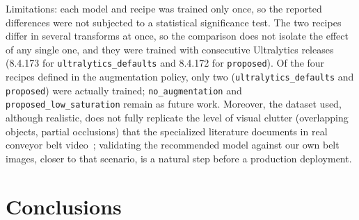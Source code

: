 \documentclass[conference]{IEEEtran}
\begin{document}
Limitations: each model and recipe was trained only once, so the reported differences were
not subjected to a statistical significance test. The two recipes differ in several transforms
at once, so the comparison does not isolate the effect of any single one, and they were
trained with consecutive Ultralytics releases (8.4.173 for \texttt{ultralytics\_defaults} and
8.4.172 for \texttt{proposed}). Of the four recipes defined in the augmentation policy, only two
(\texttt{ultralytics\_defaults} and \texttt{proposed}) were actually trained;
\texttt{no\_augmentation} and \texttt{proposed\_low\_saturation} remain as future work.
Moreover, the dataset used, although realistic, does not fully replicate the level of visual
clutter (overlapping objects, partial occlusions) that the specialized literature documents in
real conveyor belt video~\cite{bashkirova2022}; validating the recommended model against our
own belt images, closer to that scenario, is a natural step before a production deployment.

\section{Conclusions}
\end{document}
